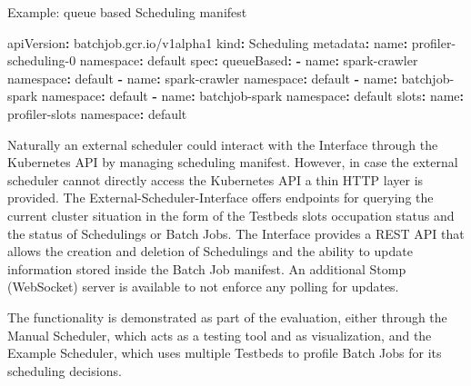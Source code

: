\documentclass[
]{article}
\newenvironment{Shaded}{\begin{snugshade}}{\end{snugshade}}
\newcommand{\AttributeTok}[1]{\textcolor[rgb]{0.77,0.63,0.00}{#1}}
\newcommand{\FunctionTok}[1]{\textcolor[rgb]{0.00,0.00,0.00}{#1}}
\newcommand{\KeywordTok}[1]{\textcolor[rgb]{0.13,0.29,0.53}{\textbf{#1}}}
\begin{document}
\begin{codelisting}

\caption{Example: queue based Scheduling manifest}

\hypertarget{lst:captionAttr}{%
\label{lst:captionAttr}}%
\begin{Shaded}
\begin{Highlighting}[]
\FunctionTok{apiVersion}\KeywordTok{:}\AttributeTok{ batchjob.gcr.io/v1alpha1}
\FunctionTok{kind}\KeywordTok{:}\AttributeTok{ Scheduling}
\FunctionTok{metadata}\KeywordTok{:}
\AttributeTok{  }\FunctionTok{name}\KeywordTok{:}\AttributeTok{ profiler{-}scheduling{-}0}
\AttributeTok{  }\FunctionTok{namespace}\KeywordTok{:}\AttributeTok{ default}
\FunctionTok{spec}\KeywordTok{:}
\AttributeTok{  }\FunctionTok{queueBased}\KeywordTok{:}
\AttributeTok{    }\KeywordTok{{-}}\AttributeTok{ }\FunctionTok{name}\KeywordTok{:}\AttributeTok{ spark{-}crawler}
\AttributeTok{      }\FunctionTok{namespace}\KeywordTok{:}\AttributeTok{ default}
\AttributeTok{    }\KeywordTok{{-}}\AttributeTok{ }\FunctionTok{name}\KeywordTok{:}\AttributeTok{ spark{-}crawler}
\AttributeTok{      }\FunctionTok{namespace}\KeywordTok{:}\AttributeTok{ default}
\AttributeTok{    }\KeywordTok{{-}}\AttributeTok{ }\FunctionTok{name}\KeywordTok{:}\AttributeTok{ batchjob{-}spark}
\AttributeTok{      }\FunctionTok{namespace}\KeywordTok{:}\AttributeTok{ default}
\AttributeTok{    }\KeywordTok{{-}}\AttributeTok{ }\FunctionTok{name}\KeywordTok{:}\AttributeTok{ batchjob{-}spark}
\AttributeTok{      }\FunctionTok{namespace}\KeywordTok{:}\AttributeTok{ default}
\AttributeTok{  }\FunctionTok{slots}\KeywordTok{:}
\AttributeTok{    }\FunctionTok{name}\KeywordTok{:}\AttributeTok{ profiler{-}slots}
\AttributeTok{    }\FunctionTok{namespace}\KeywordTok{:}\AttributeTok{ default}
\end{Highlighting}
\end{Shaded}

\end{codelisting}

Naturally an external scheduler could interact with the Interface
through the Kubernetes API by managing scheduling manifest. However, in
case the external scheduler cannot directly access the Kubernetes API a
thin HTTP layer is provided. The External-Scheduler-Interface offers
endpoints for querying the current cluster situation in the form of the
Testbeds slots occupation status and the status of Schedulings or Batch
Jobs. The Interface provides a REST API that allows the creation and
deletion of Schedulings and the ability to update information stored
inside the Batch Job manifest. An additional Stomp \citep{Stomp}
(WebSocket) server is available to not enforce any polling for updates.

The functionality is demonstrated as part of the evaluation, either
through the Manual Scheduler, which acts as a testing tool and as
visualization, and the Example Scheduler, which uses multiple Testbeds
to profile Batch Jobs for its scheduling decisions.
\end{document}
